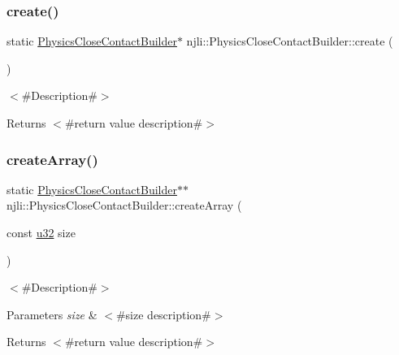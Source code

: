 \subsubsection{\texorpdfstring{create()}{create()}}
{\footnotesize\ttfamily static \mbox{\hyperlink{classnjli_1_1_physics_close_contact_builder}{Physics\+Close\+Contact\+Builder}}$\ast$ njli\+::\+Physics\+Close\+Contact\+Builder\+::create (\begin{DoxyParamCaption}{ }\end{DoxyParamCaption})\hspace{0.3cm}{\ttfamily [static]}}

$<$\#\+Description\#$>$

\begin{DoxyReturn}{Returns}
$<$\#return value description\#$>$ 
\end{DoxyReturn}
\mbox{\label{classnjli_1_1_physics_close_contact_builder_a6f9588a2c58867b6b5000c42a2504c6b}} 
\subsubsection{\texorpdfstring{create\+Array()}{createArray()}}
{\footnotesize\ttfamily static \mbox{\hyperlink{classnjli_1_1_physics_close_contact_builder}{Physics\+Close\+Contact\+Builder}}$\ast$$\ast$ njli\+::\+Physics\+Close\+Contact\+Builder\+::create\+Array (\begin{DoxyParamCaption}\item[{const \mbox{\hyperlink{_util_8h_a10e94b422ef0c20dcdec20d31a1f5049}{u32}}}]{size }\end{DoxyParamCaption})\hspace{0.3cm}{\ttfamily [static]}}

$<$\#\+Description\#$>$


\begin{DoxyParams}{Parameters}
{\em size} & $<$\#size description\#$>$\\
\hline
\end{DoxyParams}
\begin{DoxyReturn}{Returns}
$<$\#return value description\#$>$ 
\end{DoxyReturn}
\mbox{\label{classnjli_1_1_physics_close_contact_builder_a11118573af1d447f3b5861a266d05f85}} 

